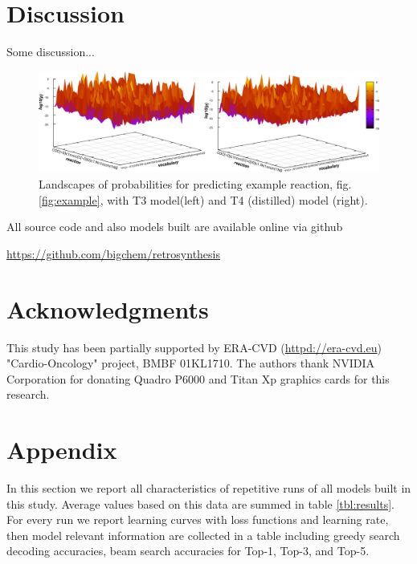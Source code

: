 \documentclass{article}
\begin{document}
\section{Discussion}

Some discussion...

\begin{figure}
  \centering
  \includegraphics[width = 16.5cm]{images/probland.pdf}
  \caption{Landscapes of probabilities for predicting example reaction, fig. \ref{fig:example}, with  T3 model(left) and T4 (distilled) model (right). }
  \label{fig:landscape}
\end{figure}

All source code and also models built are available online via github
\begin{center}
  \url{https://github.com/bigchem/retrosynthesis}
\end{center}

\section*{Acknowledgments}
This study has been partially supported by ERA-CVD (\url{httpd://era-cvd.eu}) "Cardio-Oncology" project, BMBF 01KL1710.
The authors thank NVIDIA Corporation for donating Quadro P6000 and Titan Xp graphics cards for this research.

  

 
 \newpage
 
\section{Appendix}

In this section we report all characteristics of repetitive runs of all models built in this study. Average values based on this data are summed in table \ref{tbl:results}. For every run we report learning curves with loss functions and learning rate, then model relevant information are collected in a table including greedy search decoding accuracies, beam search accuracies for Top-1, Top-3, and Top-5.
\end{document}
